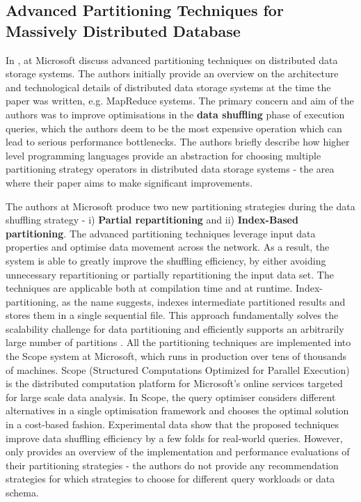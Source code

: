 \subsection{Advanced Partitioning Techniques for Massively Distributed Database}

In \cite{DBLP:conf/sigmod/ZhouBL12}, \citeauthor{DBLP:conf/sigmod/ZhouBL12} at Microsoft discuss advanced partitioning techniques on distributed data storage systems. The authors initially provide an overview on the architecture and technological details of distributed data storage systems at the time the paper was written, e.g. MapReduce systems. The primary concern and aim of the authors was to improve optimisations in the \textbf{data shuffling} phase of execution queries, which the authors deem to be the most expensive operation which can lead to serious performance bottlenecks. The authors briefly describe how higher level programming languages provide an abstraction for choosing multiple partitioning strategy operators in distributed data storage systems - the area where their paper aims to make significant improvements. 

The authors at Microsoft produce two new partitioning strategies during the data shuffling strategy - i) \textbf{Partial repartitioning} and ii) \textbf{Index-Based partitioning}. The advanced partitioning techniques leverage input data properties and optimise data movement across the network. As a result, the system is able to greatly improve the shuffling efficiency, by either avoiding unnecessary repartitioning or partially repartitioning the input data set. The techniques are applicable both at compilation time and at runtime. Index-partitioning, as the name suggests, indexes intermediate partitioned results and stores them in a single sequential file. This approach fundamentally solves the scalability challenge for data partitioning and efficiently supports an arbitrarily large number of partitions \cite{DBLP:conf/sigmod/ZhouBL12}. 
All the partitioning techniques are implemented into the Scope system at Microsoft, which runs in production over tens of thousands of machines. Scope \cite{chaiken2008scope, zhou2010incorporating} (Structured Computations Optimized for Parallel Execution) is the distributed computation platform for Microsoft’s online services targeted for large scale data analysis. In Scope, the query optimiser considers different alternatives in a single optimisation framework and chooses the optimal solution in a cost-based fashion. Experimental data show that the proposed techniques improve data shuffling efficiency by a few folds for real-world queries. However, \cite{DBLP:conf/sigmod/ZhouBL12} only provides an overview of the implementation and performance evaluations of their partitioning strategies - the authors do not provide any recommendation strategies for which strategies to choose for different query workloads or data schema. 

